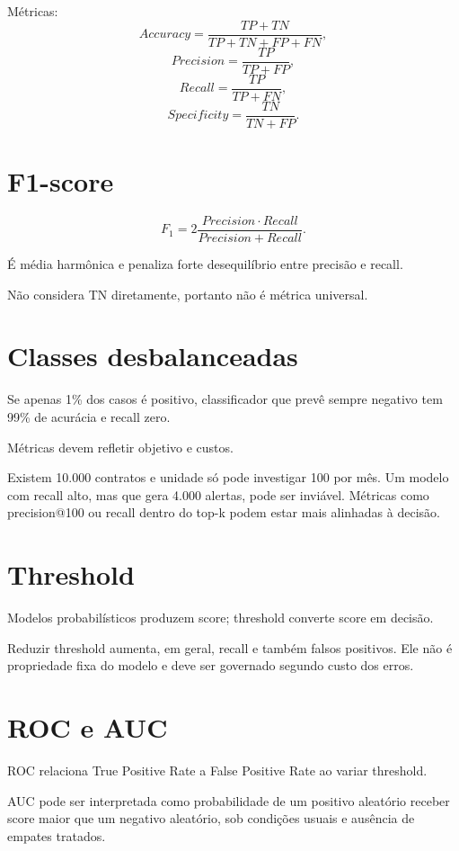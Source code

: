Métricas:
\[
Accuracy=\frac{TP+TN}{TP+TN+FP+FN},
\]
\[
Precision=\frac{TP}{TP+FP},
\]
\[
Recall=\frac{TP}{TP+FN},
\]
\[
Specificity=\frac{TN}{TN+FP}.
\]

\section{F1-score}

\[
F_1=2\frac{Precision\cdot Recall}{Precision+Recall}.
\]

É média harmônica e penaliza forte desequilíbrio entre precisão e recall.

Não considera TN diretamente, portanto não é métrica universal.

\section{Classes desbalanceadas}

Se apenas 1\% dos casos é positivo, classificador que prevê sempre negativo tem 99\% de acurácia e recall zero.

Métricas devem refletir objetivo e custos.

\begin{exemplo}
Existem 10.000 contratos e unidade só pode investigar 100 por mês. Um modelo com recall alto, mas que gera 4.000 alertas, pode ser inviável. Métricas como precision@100 ou recall dentro do top-k podem estar mais alinhadas à decisão.
\end{exemplo}

\section{Threshold}

Modelos probabilísticos produzem score; threshold converte score em decisão.

Reduzir threshold aumenta, em geral, recall e também falsos positivos. Ele não é propriedade fixa do modelo e deve ser governado segundo custo dos erros.

\section{ROC e AUC}

ROC relaciona True Positive Rate a False Positive Rate ao variar threshold.

AUC pode ser interpretada como probabilidade de um positivo aleatório receber score maior que um negativo aleatório, sob condições usuais e ausência de empates tratados.

